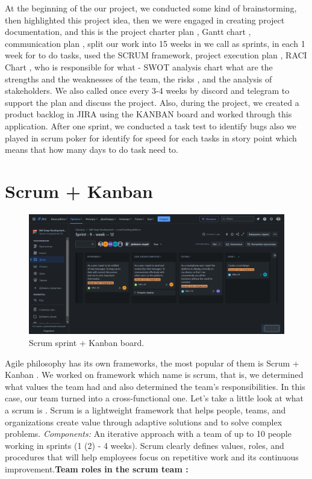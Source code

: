 At the beginning of the our project, we conducted some kind of brainstorming, then highlighted this project idea, then we were engaged in creating project documentation, and this is the project charter plan \cite{projectcharter}, Gantt chart \cite{gantChart}, communication plan \cite{communicationplant}, split our work into 15 weeks in we call as sprints, in each 1 week for to do tasks, used the SCRUM \cite{scrumguide} framework, project execution plan \cite{executionplan}, RACI Chart \cite{racichart}, who is responsible for what - SWOT analysis chart \cite{swotanalyse} what are the strengths and the weaknesses of the team, the risks \cite{risksanalyse}, and the analysis of stakeholders. We also called once every 3-4 weeks by discord \cite{discord} and telegram \cite{telegram} to support the plan and discuss the project. Also, during the project, we created a product backlog in JIRA using the KANBAN board \cite{jira} and worked through this application. After one sprint, we conducted a task test to identify bugs also we played in scrum poker for identify for speed for each tasks in story point which means that how many days to do task need to.

\section{Scrum + Kanban}\label{scrmkan}
\begin{figure}[ht]\label{fig:kanbanboard}
  \centering
  \includegraphics[width=0.8\linewidth]{figures/Kanban board.png}
  \caption{Scrum sprint + Kanban board.}
\end{figure}

Agile philosophy \cite{agile} has its own frameworks, the most popular of them is Scrum + Kanban \cite{jira}. We worked on framework which name is scrum, that is, we determined what values the team had and also determined the team's responsibilities. In this case, our team turned into a cross-functional one. Let's take a little look at what a scrum is \cite{scrumguide}. Scrum is a lightweight framework that helps people, teams, and organizations create value through adaptive solutions and to solve complex problems. \textit{Components:} An iterative approach with a team of up to 10 people working in sprints (1 (2) - 4 weeks). Scrum clearly defines values, roles, and procedures that will help employees focus on repetitive work and its continuous improvement.\textbf{Team roles in the scrum team \cite{scrumguide}:}


